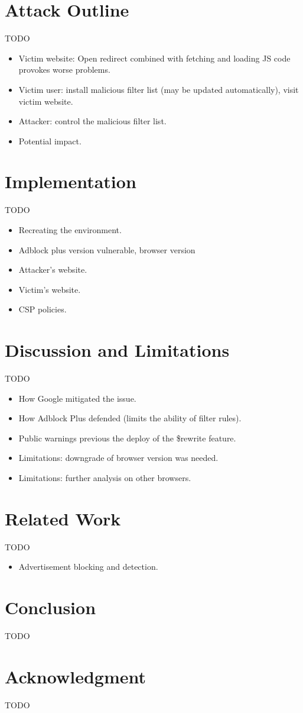 \documentclass[conference]{IEEEtran}
\begin{document}
\section{Attack Outline}
TODO
\begin{itemize}
\item Victim website: Open redirect combined with fetching and loading JS code provokes worse problems.
\item Victim user: install malicious filter list (may be updated automatically), visit victim website.
\item Attacker: control the malicious filter list.
\item Potential impact.
\end{itemize}

\section{Implementation}\label{Implementation}
TODO
\begin{itemize}
\item Recreating the environment.
\item Adblock plus version vulnerable, browser version
\item Attacker’s website.
\item Victim’s website.
\item CSP policies.
\end{itemize}

\section{Discussion and Limitations}
TODO
\begin{itemize}
\item How Google mitigated the issue.
\item How Adblock Plus defended (limits the ability of filter rules).
\item Public warnings previous the deploy of the \$rewrite feature.
\item Limitations: downgrade of browser version was needed.
\item Limitations: further analysis on other browsers.
\end{itemize}

\section{Related Work}
TODO
\begin{itemize}
\item Advertisement blocking and detection.
\end{itemize}

\section{Conclusion}
TODO

\section*{Acknowledgment}
TODO



\end{document}
